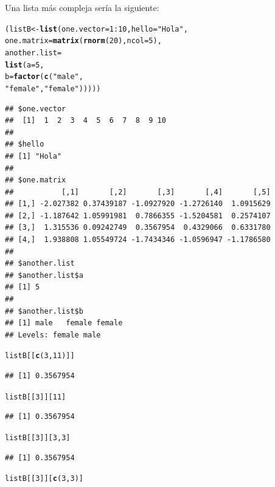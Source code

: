\documentclass{config/apuntes}\usepackage[]{graphicx}\usepackage[]{xcolor}
\makeatletter
\newcommand{\hlnum}[1]{\textcolor[rgb]{0.686,0.059,0.569}{#1}}%
\newcommand{\hlsng}[1]{\textcolor[rgb]{0.192,0.494,0.8}{#1}}%
\newcommand{\hlopt}[1]{\textcolor[rgb]{0,0,0}{#1}}%
\newcommand{\hldef}[1]{\textcolor[rgb]{0.345,0.345,0.345}{#1}}%
\newcommand{\hlkwb}[1]{\textcolor[rgb]{0.69,0.353,0.396}{#1}}%
\newcommand{\hlkwc}[1]{\textcolor[rgb]{0.333,0.667,0.333}{#1}}%
\newcommand{\hlkwd}[1]{\textcolor[rgb]{0.737,0.353,0.396}{\textbf{#1}}}%
\newenvironment{kframe}{%
 \def\at@end@of@kframe{}%
 \ifinner\ifhmode%
  \def\at@end@of@kframe{\end{minipage}}%
  \begin{minipage}{\columnwidth}%
 \fi\fi%
 \def\FrameCommand##1{\hskip\@totalleftmargin \hskip-\fboxsep
 \colorbox{shadecolor}{##1}\hskip-\fboxsep
     \hskip-\linewidth \hskip-\@totalleftmargin \hskip\columnwidth}%
 \MakeFramed {\advance\hsize-\width
   \@totalleftmargin\z@ \linewidth\hsize
   \@setminipage}}%
 {\par\unskip\endMakeFramed%
 \at@end@of@kframe}
\newenvironment{knitrout}{}{} %
\makeatother
\begin{document}
Una lista más compleja sería la siguiente:
\begin{knitrout}
\color{fgcolor}\begin{kframe}
\begin{alltt}
\hldef{(listB} \hlkwb{<-} \hlkwd{list}\hldef{(}\hlkwc{one.vector} \hldef{=} \hlnum{1}\hlopt{:}\hlnum{10}\hldef{,}  \hlkwc{hello} \hldef{=} \hlsng{"Hola"}\hldef{,}
               \hlkwc{one.matrix} \hldef{=} \hlkwd{matrix}\hldef{(}\hlkwd{rnorm}\hldef{(}\hlnum{20}\hldef{),} \hlkwc{ncol} \hldef{=} \hlnum{5}\hldef{),}
               \hlkwc{another.list} \hldef{=}
               \hlkwd{list}\hldef{(}\hlkwc{a} \hldef{=} \hlnum{5}\hldef{,}
                    \hlkwc{b} \hldef{=} \hlkwd{factor}\hldef{(}\hlkwd{c}\hldef{(}\hlsng{"male"}\hldef{,}
                      \hlsng{"female"}\hldef{,} \hlsng{"female"}\hldef{)))))}
\end{alltt}
\begin{verbatim}
## $one.vector
##  [1]  1  2  3  4  5  6  7  8  9 10
## 
## $hello
## [1] "Hola"
## 
## $one.matrix
##           [,1]       [,2]       [,3]       [,4]       [,5]
## [1,] -2.027382 0.37439187 -1.0927920 -1.2726140  1.0915629
## [2,] -1.187642 1.05991981  0.7866355 -1.5204581  0.2574107
## [3,]  1.315536 0.09242749  0.3567954  0.4329066  0.6331780
## [4,]  1.938808 1.05549724 -1.7434346 -1.0596947 -1.1786580
## 
## $another.list
## $another.list$a
## [1] 5
## 
## $another.list$b
## [1] male   female female
## Levels: female male
\end{verbatim}
\begin{alltt}
\hldef{listB[[}\hlkwd{c}\hldef{(}\hlnum{3}\hldef{,} \hlnum{11}\hldef{)]]}
\end{alltt}
\begin{verbatim}
## [1] 0.3567954
\end{verbatim}
\begin{alltt}
\hldef{listB[[}\hlnum{3}\hldef{]][}\hlnum{11}\hldef{]}
\end{alltt}
\begin{verbatim}
## [1] 0.3567954
\end{verbatim}
\begin{alltt}
\hldef{listB[[}\hlnum{3}\hldef{]][}\hlnum{3}\hldef{,} \hlnum{3}\hldef{]}
\end{alltt}
\begin{verbatim}
## [1] 0.3567954
\end{verbatim}
\begin{alltt}
\hldef{listB[[}\hlnum{3}\hldef{]][}\hlkwd{c}\hldef{(}\hlnum{3}\hldef{,} \hlnum{3}\hldef{)]}

\end{alltt}
\end{kframe}
\end{knitrout}
\end{document}
